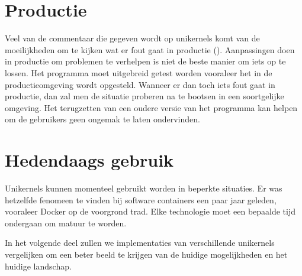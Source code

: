 \section{Productie}

Veel van de commentaar die gegeven wordt op unikernels komt van de moeilijkheden om te kijken wat er fout gaat in productie (\cite{bryan_cantrill_unikernels_2016}). Aanpassingen doen in productie om problemen te verhelpen is niet de beste manier om iets op te lossen. Het programma moet uitgebreid getest worden vooraleer het in de productieomgeving wordt opgesteld. Wanneer er dan toch iets fout gaat in productie, dan zal men de situatie proberen na te bootsen in een soortgelijke omgeving. Het terugzetten van een oudere versie van het programma kan helpen om de gebruikers geen ongemak te laten ondervinden.

\section{Hedendaags gebruik}

Unikernels kunnen momenteel gebruikt worden in beperkte situaties. Er was hetzelfde fenomeen te vinden bij software containers een paar jaar geleden, vooraleer Docker op de voorgrond trad. Elke technologie moet een bepaalde tijd ondergaan om matuur te worden.

In het volgende deel zullen we implementaties van verschillende unikernels vergelijken om een beter beeld te krijgen van de huidige mogelijkheden en het huidige landschap.

